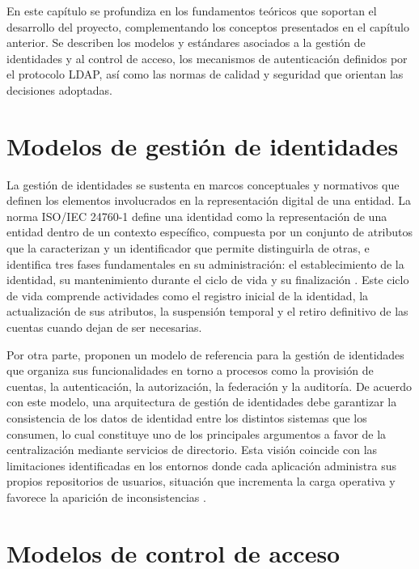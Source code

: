 \label{cap:marco_teorico}
\vspace*{0.7cm}

En este capítulo se profundiza en los fundamentos teóricos que soportan el desarrollo del proyecto, complementando los conceptos presentados en el capítulo anterior. Se describen los modelos y estándares asociados a la gestión de identidades y al control de acceso, los mecanismos de autenticación definidos por el protocolo \acs{LDAP}, así como las normas de calidad y seguridad que orientan las decisiones adoptadas.
\section{Modelos de gestión de identidades}

La gestión de identidades se sustenta en marcos conceptuales y normativos que definen los elementos involucrados en la representación digital de una entidad. La norma ISO/IEC 24760-1 define una identidad como la representación de una entidad dentro de un contexto específico, compuesta por un conjunto de atributos que la caracterizan y un identificador que permite distinguirla de otras, e identifica tres fases fundamentales en su administración: el establecimiento de la identidad, su mantenimiento durante el ciclo de vida y su finalización \citep{ISO24760}. Este ciclo de vida comprende actividades como el registro inicial de la identidad, la actualización de sus atributos, la suspensión temporal y el retiro definitivo de las cuentas cuando dejan de ser necesarias.

Por otra parte, \citet{Pohn2022} proponen un modelo de referencia para la gestión de identidades que organiza sus funcionalidades en torno a procesos como la provisión de cuentas, la autenticación, la autorización, la federación y la auditoría. De acuerdo con este modelo, una arquitectura de gestión de identidades debe garantizar la consistencia de los datos de identidad entre los distintos sistemas que los consumen, lo cual constituye uno de los principales argumentos a favor de la centralización mediante servicios de directorio. Esta visión coincide con las limitaciones identificadas en los entornos donde cada aplicación administra sus propios repositorios de usuarios, situación que incrementa la carga operativa y favorece la aparición de inconsistencias \citep{Pohn2020}.

\section{Modelos de control de acceso}

